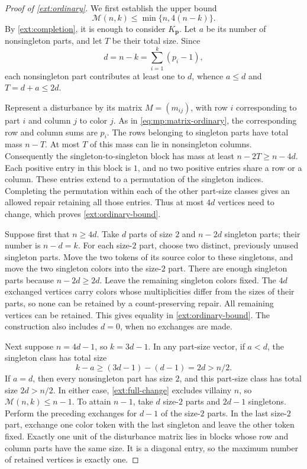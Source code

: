 \documentclass[10pt,a4paper]{amsart}
\numberwithin{equation}{section}
\theoremstyle{definition}
\theoremstyle{remark}
\begin{document}
\begin{proof}[Proof of \cref{ext:ordinary}]
We first establish the upper bound
\begin{equation}
\label{ext:ordinary-bound}
 \mathcal M(n,k)\le\min\{n,4(n-k)\}.
\end{equation}
By \cref{ext:completion}, it is enough to consider
$K_{\mathbf p}$.  Let $a$ be its number of nonsingleton parts, and let
$T$ be their total size.  Since
\[
 d=n-k=\sum_{i=1}^k(p_i-1),
\]
each nonsingleton part contributes at least one to $d$, whence
$a\le d$ and $T=d+a\le2d$.

Represent a disturbance by its matrix $M=(m_{ij})$, with row $i$
corresponding to part $i$ and column $j$ to color $j$.  As in
\eqref{eq:mp:matrix-ordinary}, the corresponding row and column sums
are $p_i$.  The rows belonging to singleton parts have total mass
$n-T$.  At most $T$ of this mass can lie in nonsingleton columns.
Consequently the singleton-to-singleton block has mass at least
$n-2T\ge n-4d$.  Each positive entry in this block is $1$, and no two
positive entries share a row or a column.  These entries extend to a
permutation of the singleton indices.  Completing the permutation
within each of the other part-size classes gives an allowed repair
retaining all those entries.  Thus at most $4d$ vertices need to change,
which proves \eqref{ext:ordinary-bound}.

Suppose first that $n\ge4d$.  Take $d$ parts of size $2$ and $n-2d$
singleton parts; their number is $n-d=k$.  For each size-$2$ part,
choose two distinct, previously unused singleton parts.  Move the two
tokens of its source color to these singletons, and move the two
singleton colors into the size-$2$ part.  There are enough singleton
parts because $n-2d\ge2d$.  Leave the remaining singleton colors fixed.
The $4d$ exchanged vertices carry colors whose multiplicities differ
from the sizes of their parts, so none can be retained by a
count-preserving repair.  All remaining vertices can be retained.
This gives equality in \eqref{ext:ordinary-bound}.  The construction
also includes $d=0$, when no exchanges are made.

Next suppose $n=4d-1$, so $k=3d-1$.  In any part-size vector, if
$a<d$, the singleton class has total size
\[
 k-a\ge (3d-1)-(d-1)=2d>n/2.
\]
If $a=d$, then every nonsingleton part has size $2$, and this part-size
class has total size $2d>n/2$.  In either case,
\eqref{ext:full-change} excludes villainy $n$, so
$\mathcal M(n,k)\le n-1$.  To attain $n-1$, take $d$ size-$2$ parts
and $2d-1$ singletons.  Perform the preceding exchanges for $d-1$ of
the size-$2$ parts.  In the last size-$2$ part, exchange one color
token with the last singleton and leave the other token fixed.
Exactly one unit of the disturbance matrix lies in blocks whose row
and column parts have the same size.  It is a diagonal entry, so the
maximum number of retained vertices is exactly one.


\end{proof}
\end{document}

